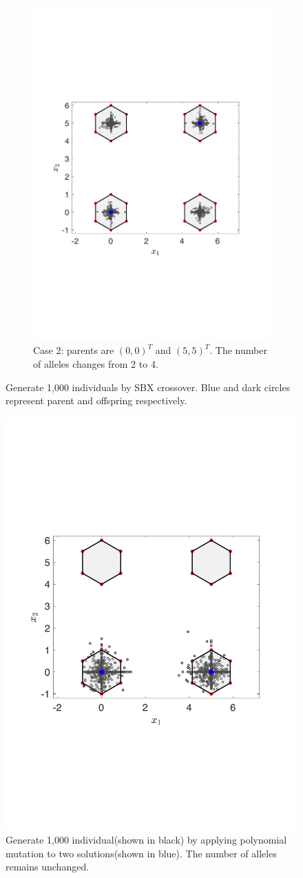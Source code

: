 \documentclass[conference]{IEEEtran}
\begin{document}
\begin{figure}[htbp]
\begin{subfigure}[b]{.24\textwidth}
		\includegraphics[width=\linewidth]{Section3/crossover2}
		\caption{Case 2: parents are $(0, 0)^T$ and $(5, 5)^T$. The number of alleles changes from 2 to 4.}
		\label{fig: SBX crossover case 2}
	\end{subfigure}
	\caption{Generate 1,000 individuals by SBX crossover. Blue and dark circles represent parent and offspring respectively.}
	\label{fig: SBX crossover}
\end{figure}

\begin{figure}[htbp]
    \centering
    \includegraphics[width=.3\textwidth]{Section3/mutation}
    \caption{Generate 1,000 individual(shown in black) by applying polynomial mutation to two solutions(shown in blue). The number of alleles remains unchanged.}
    \label{fig: Polynomial mutation}
\end{figure}
\end{document}
